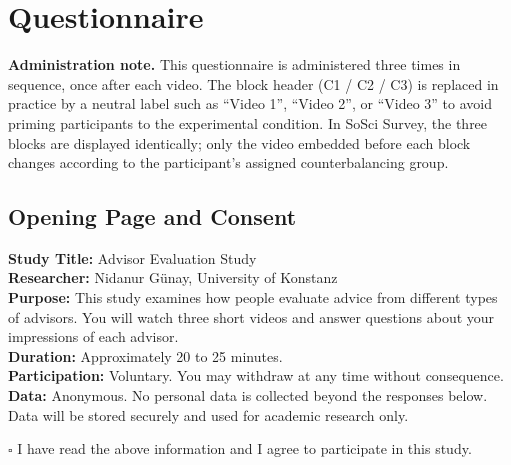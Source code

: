 \documentclass[11pt, a4paper]{article}
\begin{document}
\newpage


\section{Questionnaire}
\label{sec:questionnaire}

\begin{warnbox}
\small\textbf{Administration note.} This questionnaire is administered three times in sequence, once after each video. The block header (C1 / C2 / C3) is replaced in practice by a neutral label such as ``Video 1'', ``Video 2'', or ``Video 3'' to avoid priming participants to the experimental condition. In SoSci Survey, the three blocks are displayed identically; only the video embedded before each block changes according to the participant's assigned counterbalancing group.
\end{warnbox}

\subsection{Opening Page and Consent}

\begin{infobox}
\small
\textbf{Study Title:} Advisor Evaluation Study\\[4pt]
\textbf{Researcher:} Nidanur Günay, University of Konstanz\\[4pt]
\textbf{Purpose:} This study examines how people evaluate advice from different types of advisors. You will watch three short videos and answer questions about your impressions of each advisor.\\[4pt]
\textbf{Duration:} Approximately 20 to 25 minutes.\\[4pt]
\textbf{Participation:} Voluntary. You may withdraw at any time without consequence.\\[4pt]
\textbf{Data:} Anonymous. No personal data is collected beyond the responses below. Data will be stored securely and used for academic research only.
\end{infobox}

\vspace{6pt}
$\square$ \quad \small I have read the above information and I agree to participate in this study.

\vspace{12pt}
\end{document}
